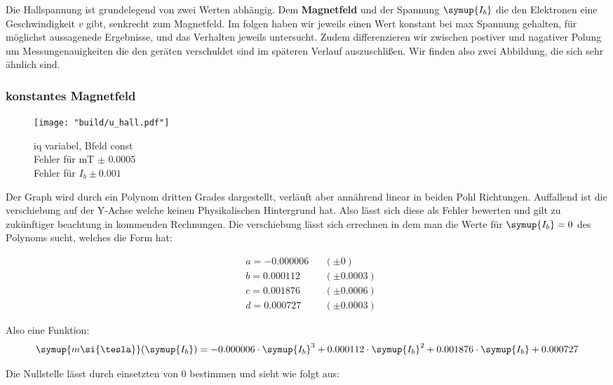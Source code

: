 Die Hallspannung ist grundelegend von zwei Werten abhängig. Dem \textbf{Magnetfeld} und der Spannung  $\symup{I_b}$ die den Elektronen eine Geschwindigkeit $v$ gibt, senkrecht zum Magnetfeld. %
Im folgen haben wir jeweils einen Wert konstant bei max Spannung gehalten, für möglichst aussagenede Ergebnisse, und das Verhalten jeweils untersucht. 
Zudem differenzieren wir zwischen postiver und nagativer Polung um Messungenauigkeiten die den geräten verschuldet sind im späteren Verlauf auszuschlißen. %
Wir finden also zwei Abbildung, die sich sehr ähnlich sind.

\subsubsection{konstantes Magnetfeld}
\label{sec:Auswertung_bconst}

\begin{figure}
   \centering
    \texttt{[image: "build/u\_hall.pdf"]}
    \caption{iq variabel, Bfeld const\\Fehler für mT $\pm$ 0.0005\\Fehler für $I_b \pm 0.001$}
    \label{fig:Uhall}
 \end{figure}

Der Graph wird durch ein Polynom dritten Grades dargestellt, verläuft aber annährend linear in beiden Pohl Richtungen. Auffallend ist die verschiebung auf der Y-Achse %
welche keinen Physikalischen Hintergrund hat. Also lässt sich diese als Fehler bewerten und gilt zu zukünftiger beachtung in kommenden Rechnungen.
Die verschiebung lässt sich errechnen in dem man die Werte für $\symup{I_b}=0$ des Polynoms sucht, welches die Form hat:

\begin{align*}
   &a = -0.000006 &&(\pm 0) \\
   &b = 0.000112 &&(\pm 0.0003)\\
   &c = 0.001876 &&(\pm 0.0006) \\
   &d = 0.000727 &&(\pm 0.0003) 
\end{align*}

Also eine Funktion:
\begin{equation}
   \symup{m\si{\tesla}}(\symup{I_b})=-0.000006 \cdot \symup{I_b}^3 + 0.000112\cdot\symup{I_b}^2 + 0.001876 \cdot\symup{I_b} + 0.000727 
\end{equation}

Die Nullstelle lässt durch einsetzten von $0$ bestimmen und sieht wie folgt aus:

